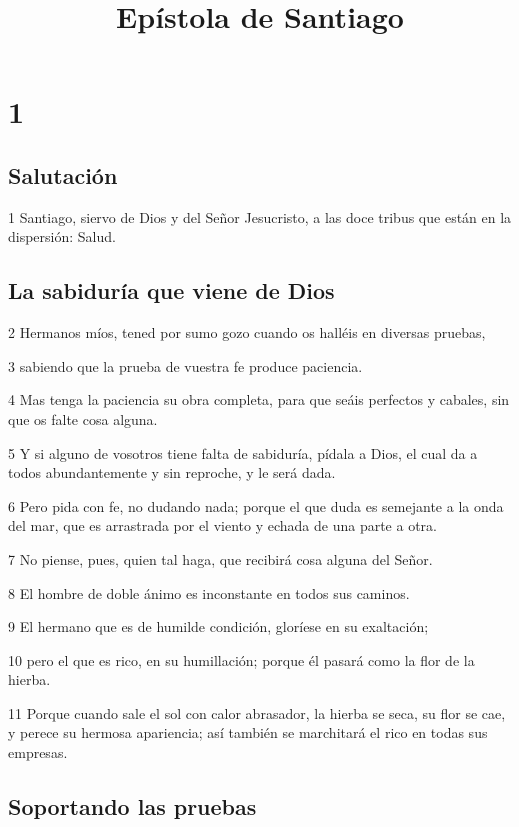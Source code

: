 
\title{Epístola de Santiago}

\chapter{1}

\section*{Salutación}

\par 1 Santiago, siervo de Dios y del Señor Jesucristo, a las doce tribus que están en la dispersión: Salud.

\section*{La sabiduría que viene de Dios}

\par 2 Hermanos míos, tened por sumo gozo cuando os halléis en diversas pruebas,
\par 3 sabiendo que la prueba de vuestra fe produce paciencia.
\par 4 Mas tenga la paciencia su obra completa, para que seáis perfectos y cabales, sin que os falte cosa alguna.
\par 5 Y si alguno de vosotros tiene falta de sabiduría, pídala a Dios, el cual da a todos abundantemente y sin reproche, y le será dada.
\par 6 Pero pida con fe, no dudando nada; porque el que duda es semejante a la onda del mar, que es arrastrada por el viento y echada de una parte a otra.
\par 7 No piense, pues, quien tal haga, que recibirá cosa alguna del Señor.
\par 8 El hombre de doble ánimo es inconstante en todos sus caminos.
\par 9 El hermano que es de humilde condición, gloríese en su exaltación;
\par 10 pero el que es rico, en su humillación; porque él pasará como la flor de la hierba.
\par 11 Porque cuando sale el sol con calor abrasador, la hierba se seca, su flor se cae, y perece su hermosa apariencia; así también se marchitará el rico en todas sus empresas.

\section*{Soportando las pruebas}

